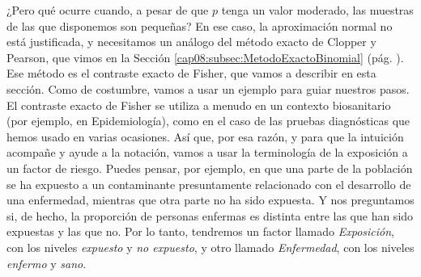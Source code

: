 ¿Pero qué ocurre cuando, a pesar de que $p$ tenga un valor moderado,  las muestras de las que disponemos son pequeñas? En ese caso, la aproximación normal no está justificada, y necesitamos un análogo del método exacto de Clopper y Pearson, que vimos en la Sección \ref{cap08:subsec:MetodoExactoBinomial} (pág. \pageref{cap08:subsec:MetodoExactoBinomial}). Ese método es el {\sf contraste exacto de Fisher}, que vamos a describir en esta sección. Como de costumbre, vamos a usar un ejemplo para guiar nuestros pasos. El contraste exacto de Fisher se utiliza a menudo en un contexto biosanitario (por ejemplo, en Epidemiología), como en el caso de las pruebas diagnósticas que hemos usado en varias ocasiones. Así que, por esa razón, y para que la intuición acompañe y ayude a la notación, vamos a usar la terminología de la {\sf exposición a un factor de riesgo}. Puedes pensar, por ejemplo, en que una parte de la población se ha expuesto a un contaminante presuntamente relacionado con el desarrollo de una enfermedad, mientras que otra parte no ha sido expuesta. Y nos preguntamos si, de hecho, la proporción de personas enfermas es distinta entre las que han sido expuestas y las que no. Por lo tanto, tendremos un factor llamado {\em Exposición}, con los niveles {\em expuesto} y {\em no expuesto}, y otro llamado {\em Enfermedad}, con los niveles {\em enfermo} y {\em sano}.
